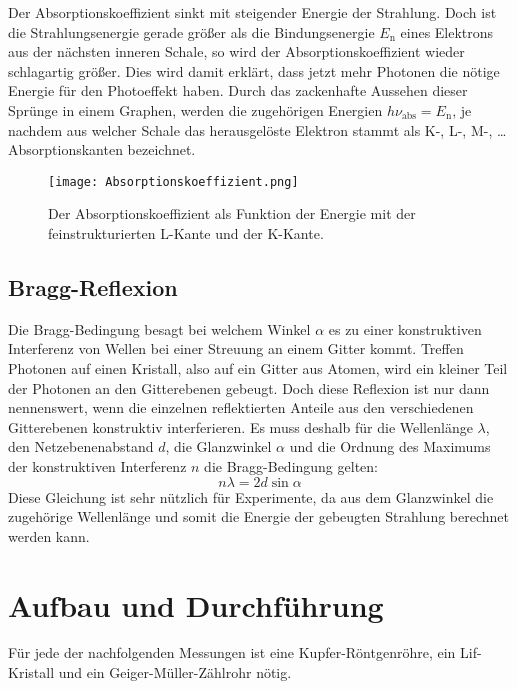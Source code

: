 \documentclass[titlepage = firstcover]{scrartcl}
\begin{document}
        Der Absorptionskoeffizient sinkt mit steigender Energie der Strahlung. Doch ist die Strahlungsenergie gerade größer als die Bindungsenergie $E_\text{n}$ eines Elektrons aus der nächsten inneren Schale, so wird der Absorptionskoeffizient wieder schlagartig größer. Dies wird damit erklärt, dass jetzt mehr Photonen die nötige Energie für den Photoeffekt haben. Durch das zackenhafte Aussehen dieser Sprünge in einem Graphen, werden die zugehörigen Energien $h \nu_\text{abs} = E_\text{n}$, je nachdem aus welcher Schale das herausgelöste Elektron stammt als K-, L-, M-, \dots \, Absorptionskanten bezeichnet.
        \begin{figure}[h]
          \centering
          \texttt{[image: Absorptionskoeffizient.png]}
          \caption{Der Absorptionskoeffizient als Funktion der Energie mit der feinstrukturierten L-Kante und der K-Kante.}
          \label{fig:absorptionskoeffizient}
        \end{figure}
        \FloatBarrier

      \subsection{Bragg-Reflexion}
        Die Bragg-Bedingung besagt bei welchem Winkel $\alpha$ es zu einer konstruktiven Interferenz von Wellen bei einer Streuung an einem Gitter kommt. Treffen Photonen auf einen Kristall, also auf ein Gitter aus Atomen, wird ein kleiner Teil der Photonen an den Gitterebenen gebeugt. Doch diese Reflexion ist nur dann nennenswert, wenn die einzelnen reflektierten Anteile aus den verschiedenen Gitterebenen konstruktiv interferieren. Es muss deshalb für die Wellenlänge $\lambda$, den Netzebenenabstand $d$, die Glanzwinkel $\alpha$ und die Ordnung des Maximums der konstruktiven Interferenz $n$ die Bragg-Bedingung gelten:
        \begin{equation}
          n \lambda = 2 d \sin{\alpha}
          \label{eqn:bragg}
        \end{equation}
        Diese Gleichung ist sehr nützlich für Experimente, da aus dem Glanzwinkel die zugehörige Wellenlänge und somit die Energie der gebeugten Strahlung berechnet werden kann.

    \section{Aufbau und Durchführung}
      Für jede der nachfolgenden Messungen ist eine Kupfer-Röntgenröhre, ein Lif-Kristall und ein Geiger-Müller-Zählrohr nötig.
\end{document}
